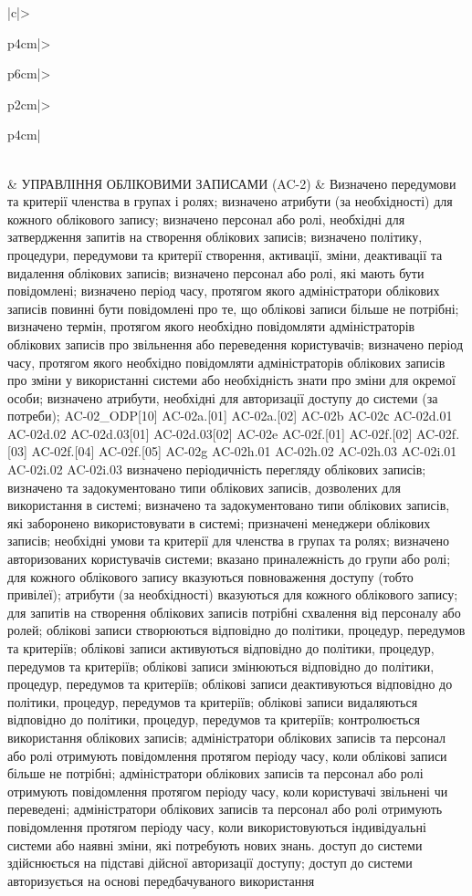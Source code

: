 \documentclass[10pt]{article}
\begin{document}
\begin{longtable}{|c|>{\raggedright\arraybackslash}p{4cm}|>{\raggedright\arraybackslash}p{6cm}|>{\raggedright\arraybackslash}p{2cm}|>{\raggedright\arraybackslash}p{4cm}|}
 \\  & УПРАВЛІННЯ ОБЛІКОВИМИ ЗАПИСАМИ (AC-2) & Визначено передумови та критерії членства в групах і ролях; визначено атрибути (за необхідності) для кожного облікового запису; визначено персонал або ролі, необхідні для затвердження запитів на створення облікових записів; визначено політику, процедури, передумови та критерії створення, активації, зміни, деактивації та видалення облікових записів; визначено персонал або ролі, які мають бути повідомлені; визначено період часу, протягом якого адміністратори облікових записів повинні бути повідомлені про те, що облікові записи більше не потрібні; визначено термін, протягом якого необхідно повідомляти адміністраторів облікових записів про звільнення або переведення користувачів; визначено період часу, протягом якого необхідно повідомляти адміністраторів облікових записів про зміни у використанні системи або необхідність знати про зміни для окремої особи; визначено атрибути, необхідні для авторизації доступу до системи (за потреби); AC-02\_\allowbreak{}ODP[10] AC-02a.[01] AC-02a.[02] AC-02b AC-02с AC-02d.01 AC-02d.02 AC-02d.03[01] AC-02d.03[02] AC-02e AC-02f.[01] AC-02f.[02] AC-02f.[03] AC-02f.[04] AC-02f.[05] AC-02g AC-02h.01 AC-02h.02 AC-02h.03 AC-02i.01 AC-02i.02 AC-02i.03 визначено періодичність перегляду облікових записів; визначено та задокументовано типи облікових записів, дозволених для використання в системі; визначено та задокументовано типи облікових записів, які заборонено використовувати в системі; призначені менеджери облікових записів; необхідні умови та критерії для членства в групах та ролях; визначено авторизованих користувачів системи; вказано приналежність до групи або ролі; для кожного облікового запису вказуються повноваження доступу (тобто привілеї); атрибути (за необхідності) вказуються для кожного облікового запису; для запитів на створення облікових записів потрібні схвалення від персоналу або ролей; облікові записи створюються відповідно до політики, процедур, передумов та критеріїв; облікові записи активуються відповідно до політики, процедур, передумов та критеріїв; облікові записи змінюються відповідно до політики, процедур, передумов та критеріїв; облікові записи деактивуються відповідно до політики, процедур, передумов та критеріїв; облікові записи видаляються відповідно до політики, процедур, передумов та критеріїв; контролюється використання облікових записів; адміністратори облікових записів та персонал або ролі отримують повідомлення протягом періоду часу, коли облікові записи більше не потрібні; адміністратори облікових записів та персонал або ролі отримують повідомлення протягом періоду часу, коли користувачі звільнені чи переведені; адміністратори облікових записів та персонал або ролі отримують повідомлення протягом періоду часу, коли використовуються індивідуальні системи або наявні зміни, які потребують нових знань. доступ до системи здійснюється на підставі дійсної авторизації доступу; доступ до системи авторизується на основі передбачуваного використання 
\end{longtable}
\end{document}
